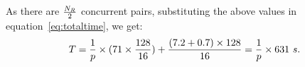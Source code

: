 \documentclass{rspublic}
\newcommand{\alnote}[1]{ {\textcolor{blue} { ***andre: #1 }}}
\newcommand{\athotanote}[1]{ {\textcolor{green} { ***athota: #1 }}}
\newcommand{\alnote}[1]{}
\newcommand{\athotanote}[1]{}
\begin{document}






As there are $N_R \over 2$ concurrent pairs, substituting the above
values in equation~\ref{eq:totaltime}, we get:
\begin{eqnarray}
T=  {1 \over p} \times {{(71\times {128\over 16}}) + {(7.2+0.7)\times 128\over 16}} = {1 \over p} \times 631~s.
\label{eq:decent}
\end{eqnarray}

\end{document}
